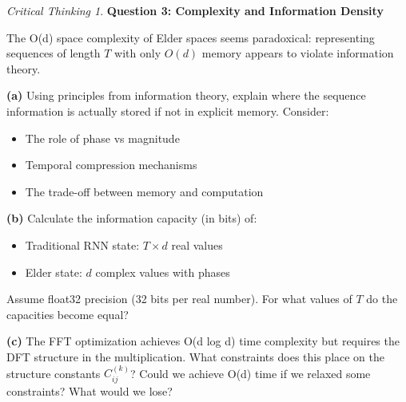 \documentclass[12pt,a4paper]{book}
\theoremstyle{definition}
\theoremstyle{remark}
\newtheorem*{critical}{Critical Thinking}
\begin{document}
\begin{critical}
\textbf{Question 3: Complexity and Information Density}

The O(d) space complexity of Elder spaces seems paradoxical: representing sequences of length $T$ with only $O(d)$ memory appears to violate information theory.

\textbf{(a)} Using principles from information theory, explain where the sequence information is actually stored if not in explicit memory. Consider:
\begin{itemize}
\item The role of phase vs magnitude
\item Temporal compression mechanisms
\item The trade-off between memory and computation
\end{itemize}

\textbf{(b)} Calculate the information capacity (in bits) of:
\begin{itemize}
\item Traditional RNN state: $T \times d$ real values
\item Elder state: $d$ complex values with phases
\end{itemize}

Assume float32 precision (32 bits per real number). For what values of $T$ do the capacities become equal?

\textbf{(c)} The FFT optimization achieves O(d log d) time complexity but requires the DFT structure in the multiplication. What constraints does this place on the structure constants $C_{ij}^{(k)}$? Could we achieve O(d) time if we relaxed some constraints? What would we lose?
\end{critical}
\end{document}
